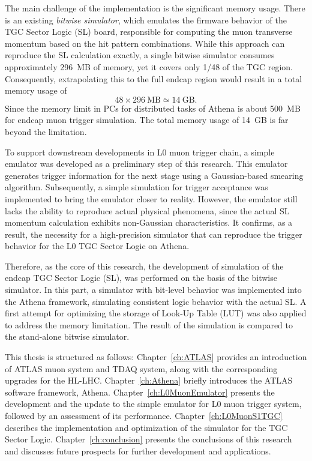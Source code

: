 The main challenge of the implementation is the significant memory usage. There is an existing \textit{bitwise simulator}, which emulates the firmware behavior of the TGC Sector Logic (SL) board, responsible for computing the muon transverse momentum based on the hit pattern combinations. While this approach can reproduce the SL calculation exactly, a single bitwise simulator consumes approximately 296~MB of memory, yet it covers only 1/48 of the TGC region. Consequently, extrapolating this to the full endcap region would result in a total memory usage of
\[
48 \times 296~\text{MB} \simeq 14~\text{GB}.
\]
Since the memory limit in PCs for distributed tasks of Athena is about 500~MB for endcap muon trigger simulation. The total memory usage of 14~GB is far beyond the limitation.

To support downstream developments in L0 muon trigger chain, a simple emulator was developed as a preliminary step of this research. This emulator generates trigger information for the next stage using a Gaussian-based smearing algorithm. Subsequently, a simple simulation for trigger acceptance was implemented to bring the emulator closer to reality. However, the emulator still lacks the ability to reproduce actual physical phenomena, since the actual SL momentum calculation exhibits non-Gaussian characteristics. It confirms, as a result, the necessity for a high-precision simulator that can reproduce the trigger behavior for the L0 TGC Sector Logic on Athena.

Therefore, as the core of this research, the development of simulation of the endcap TGC Sector Logic (SL), was performed on the basis of the bitwise simulator. In this part, a simulator with bit-level behavior was implemented into the Athena framework, simulating consistent logic behavior with the actual SL. A first attempt for optimizing the storage of Look-Up Table (LUT) was also applied to address the memory limitation. The result of the simulation is compared to the stand-alone bitwise simulator.

This thesis is structured as follows: Chapter~\ref{ch:ATLAS} provides an introduction of ATLAS muon system and TDAQ system, along with the corresponding upgrades for the HL-LHC. Chapter~\ref{ch:Athena} briefly introduces the ATLAS software framework, Athena. Chapter~\ref{ch:L0MuonEmulator} presents the development and the update to the simple emulator for L0 muon trigger system, followed by an assessment of its performance. Chapter~\ref{ch:L0MuonS1TGC} describes the implementation and optimization of the simulator for the TGC Sector Logic. Chapter~\ref{ch:conclusion} presents the conclusions of this research and discusses future prospects for further development and applications.